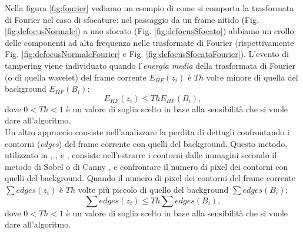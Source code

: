 Nella figura \ref{fig:fourier} vediamo un esempio di come si comporta la trasformata di Fourier nel caso di sfocature: 
nel passaggio da un frame nitido (Fig. \ref{fig:defocusNormale}) a uno sfocato (Fig. \ref{fig:defocusSfocato}) abbiamo un crollo delle componenti ad alta frequenza nelle trasformate di Fourier (rispettivamente Fig. \ref{fig:defocusNormaleFourier} e Fig. \ref{fig:defocusSfocatoFourier}).
L'evento di tampering viene individuato quando l'\textit{energia media} della trasformata di Fourier (o di quella wavelet) del frame corrente $E_{HF}(z_i)$ \`e $Th$ volte minore di quella del background $E_{HF}(B_i)$:
\[E_{HF}(z_i)\leq Th E_{HF}(B_i),\]
dove $0<Th<1$ \`e  un valore di soglia scelto in base alla sensibilit\`a che si vuole dare all'algoritmo.\\
Un altro approccio consiste nell'analizzare la perdita di dettagli confrontando i contorni (\textit{edges}) del frame corrente con quelli del background.
Questo metodo, utilizzato in \cite{ellwart2012camera}, \cite{gil2007automatic}, \cite{harasse2004automated} e \cite{kryjak2012fpga}, consiste nell'estrarre i contorni dalle immagini secondo il metodo di Sobel \cite{sobel19683x3} o di Canny \cite{canny1986computational}, e confrontare il numero di pixel dei contorni con quelli del background. 
Quando il numero di pixel dei contorni del frame corrente $\sum edges(z_i)$ \`e $Th$ volte pi\`u piccolo di quello del background $\sum edges(B_i)$:
\[ \sum edges(z_i) \leq Th \sum edges(B_i), \]
dove $0<Th<1$ \`e  un valore di soglia scelto in base alla sensibilit\`a che si vuole dare all'algoritmo.
